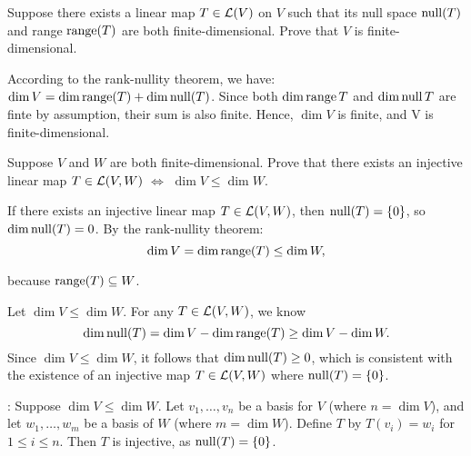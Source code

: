 \begin{xrcs}
  Suppose there exists a linear map $T \in \mathcal{L}(V)$ on $V$ such that its null space $\operatorname{null}(T)$ and range $\operatorname{range}(T)$ are both finite-dimensional. Prove that $V$ is finite-dimensional.

  \begin{xprf}
    According to the rank-nullity theorem, we have: $ \dim V = \dim \operatorname{range}(T) + \dim \operatorname{null}(T)$. Since both $\dim \operatorname{range} T$ and $\dim \operatorname{null} T$ are finte by assumption, their sum is also finite. Hence, $\dim V$ is finite, and V is finite-dimensional.
  \end{xprf}
\end{xrcs}

\begin{xrcs}
  Suppose $V$ and $W$ are both finite-dimensional. Prove that there exists an injective linear map $T \in \mathcal{L}(V,W)$ $\iff$ $\dim V \leq \dim W$.

  \begin{xprf}
    \Rightarrowdirection If there exists an injective linear map $T \in \mathcal{L}(V,W)$, then $\operatorname{null}(T) = \{0\}$, so $\dim \operatorname{null}(T) = 0$. By the rank-nullity theorem:
    \begin{equation}
      \dim V = \dim \operatorname{range}(T) \leq \dim W,
    \end{equation}

    because $ \operatorname{range}(T) \subseteq W$.

    \Leftarrowdirection Let $\dim V \leq \dim W$. For any $T \in \mathcal{L}(V,W)$, we know
    \begin{equation}
      \dim \operatorname{null}(T) = \dim V - \dim \operatorname{range}(T) \geq \dim V - \dim W.
    \end{equation}
    Since $\dim V \leq \dim W$, it follows that $\dim \operatorname{null}(T) \geq 0$, which is consistent with the existence of an injective map $T \in \mathcal{L}(V,W)$ where $\operatorname{null}(T) = \{0\}$.

    :
    Suppose $\dim V \leq \dim W$. Let $v_1, \dots, v_n$ be a basis for $V$ (where $n = \dim V$), and let $w_1, \dots, w_m$ be a basis of $W$ (where $m = \dim W$). Define $T$ by $T(v_i) = w_i$ for $1 \leq i \leq n$. Then $T$ is injective, as $\operatorname{null}(T) = \{0\}$.
  \end{xprf}
\end{xrcs}


